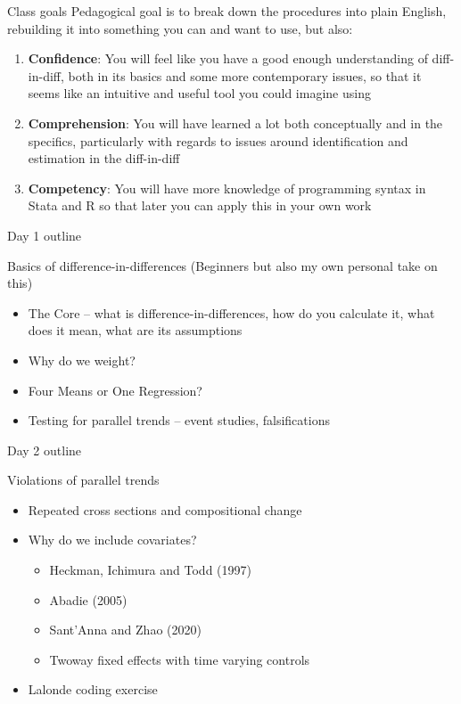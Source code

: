 \documentclass{beamer}
\begin{document}
\begin{frame}{Class goals}
Pedagogical goal is to break down the procedures into plain English, rebuilding it into something you can and want to use, but also:

  \begin{enumerate}
    \item \textbf{Confidence}: You will feel like you have a good enough understanding of diff-in-diff, both in its basics and some more contemporary issues, so that it seems like an intuitive and useful tool you could imagine using
    \item \textbf{Comprehension}: You will have learned a lot both conceptually and in the specifics, particularly with regards to issues around identification and estimation in the diff-in-diff 
    \item \textbf{Competency}: You will have more knowledge of programming syntax in Stata and R so that later you can apply this in your own work
  \end{enumerate}

\end{frame}



\begin{frame}{Day 1 outline}

Basics of difference-in-differences (Beginners but also my own personal take on this)
	\begin{itemize}
	\item The Core -- what is difference-in-differences, how do you calculate it, what does it mean, what are its assumptions
	\item Why do we weight?
	\item Four Means or One Regression?
	\item Testing for parallel trends -- event studies, falsifications

	\end{itemize}

\end{frame}


\begin{frame}{Day 2 outline}

Violations of parallel trends
	\begin{itemize}
	\item Repeated cross sections and compositional change
	\item Why do we include covariates?
		\begin{itemize}
		\item Heckman, Ichimura and Todd (1997)
		\item Abadie (2005)
		\item Sant’Anna and Zhao (2020)
		\item Twoway fixed effects with time varying controls	
		\end{itemize}
	\item Lalonde coding exercise
	\end{itemize}

\end{frame}
\end{document}

